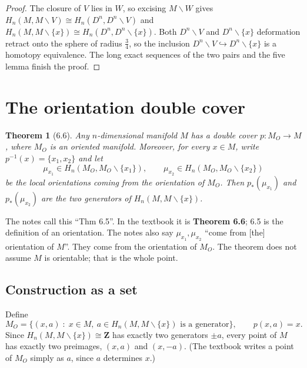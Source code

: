 \documentclass[11pt]{article}
\newcommand{\Z}{\mathbf{Z}}
\newcommand{\MO}{M_O}
\newcommand{\minus}{\smallsetminus}
\newcommand{\iso}{\cong}
\theoremstyle{namedit}
\newtheorem{thm}{Theorem}
\theoremstyle{namedrm}
\begin{document}
\begin{center}
\end{center}

\begin{proof}
The closure of $V$ lies in $W$, so excising $M\minus W$ gives
$H_n(M,M\minus V)\iso H_n(D^n,D^n\minus V)$ and
$H_n(M,M\minus\{x\})\iso H_n(D^n,D^n\minus\{x\})$.
Both $D^n\minus V$ and $D^n\minus\{x\}$ deformation retract onto the sphere of radius $\tfrac34$,
so the inclusion $D^n\minus V\hookrightarrow D^n\minus\{x\}$ is a homotopy equivalence. The long
exact sequences of the two pairs and the five lemma finish the proof.
\end{proof}

\section{The orientation double cover}

\begin{thm}[6.6]\label{thm:double}
Any $n$-dimensional manifold $M$ has a double cover $p\colon \MO\to M$, where $\MO$ is an
oriented manifold. Moreover, for every $x\in M$, write $p^{-1}(x)=\{x_1,x_2\}$ and let
\[
  \mu_{x_1}\in H_n(\MO,\MO\minus\{x_1\}),\qquad \mu_{x_2}\in H_n(\MO,\MO\minus\{x_2\})
\]
be the local orientations coming from the orientation of $\MO$. Then $p_*(\mu_{x_1})$ and
$p_*(\mu_{x_2})$ are the two generators of $H_n(M,M\minus\{x\})$.
\end{thm}

\begin{correction}[label=c:thm]
The notes call this ``Thm 6.5''. In the textbook it is \textbf{Theorem 6.6}; 6.5 is the definition of
an orientation. The notes also say $\mu_{x_1},\mu_{x_2}$ ``come from [the] orientation of $M$''.
They come from the orientation of $\MO$. The theorem does not assume $M$ is orientable; that is
the whole point.
\end{correction}

\subsection{Construction as a set}
Define
\[
  \MO=\bigl\{(x,a)\;:\;x\in M,\ a\in H_n(M,M\minus\{x\})\text{ is a generator}\bigr\},
  \qquad p(x,a)=x .
\]
Since $H_n(M,M\minus\{x\})\iso\Z$ has exactly two generators $\pm a$, every point of $M$ has exactly
two preimages, $(x,a)$ and $(x,-a)$. (The textbook writes a point of $\MO$ simply as $a$, since
$a$ determines $x$.)
\end{document}
